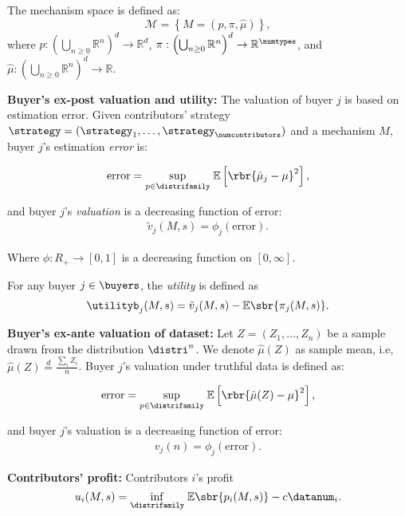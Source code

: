 The mechanism space is defined as:
\[
\mathcal{M} = \left\{ M = (p,  \pi, \hat{\mu}) \right\},
\]
where $p : \left(\bigcup_{n \geq 0} \mathbb{R}^n\right)^d \to \mathbb{R}^d$, $\pi : \left(\bigcup_{n \geq 0} \mathbb{R}^n\right)^d \to \mathbb{R}^\numtypes$, and $\hat{\mu}:  \left(\bigcup_{n \geq 0} \mathbb{R}^n\right)^d \to  \mathbb{R} $.

\textbf{Buyer's ex-post valuation and utility: } The valuation of buyer $j$ is based on estimation error. Given contributors' strategy $\strategy=(\strategy_1,\dots, \strategy_\numcontributors)$ and a mechanism $M$, buyer $j$'s estimation \emph{error} is:

\begin{align}
   \mathrm{error} =  \underset{p \in \distrifamily}{\sup} \; \mathbb{E}\left[ \rbr{\hat{\mu}_j-\mu }^2 \right] ,
\end{align}

and buyer $j$'s \emph{valuation} is a decreasing function of error:
\begin{align} \label{eq:buyervalue}
     \tilde{v}_j(M,s) = \phi_j(\mathrm{error}).
\end{align}

Where $\phi : R_{+}\to [0,1]$ is a decreasing function on $[0,\infty]$.

For any buyer $j \in \buyers$, the \emph{utility} is defined as 
\begin{align*}
    \utilityb_j (M,s) = \tilde{v}_j(M,s) - \mathbb{E}\sbr{\pi_j(M,s)} .
\end{align*}

\textbf{Buyer's ex-ante valuation of dataset: }  Let $Z=(Z_1,\dots,Z_n)$ be a sample drawn from the distribution $\distri^n$. We denote  $\hat{\mu}(Z)$ as sample mean, i.e, $\hat{\mu}(Z) \overset{d}{=} \frac{\sum_i Z_i}{n}$. Buyer $j$’s valuation under truthful data is defined as: 

\begin{align}
   \mathrm{error} =  \underset{p \in \distrifamily}{\sup} \; \mathbb{E}\left[ \rbr{\hat{\mu}(Z)-\mu }^2 \right] ,
\end{align}

and buyer $j$'s valuation is a decreasing function of error:
\begin{align} \label{eq:buyervalue}
     v_j(n) = \phi_j(\mathrm{error}).
\end{align}

\textbf{Contributors' profit: }Contributors $i$'s profit
\[ u_i(M,s) = \underset{\distrifamily}{\inf}\; \mathbb{E}\sbr{p_i(M,s)}- c\datanum_i . \]


